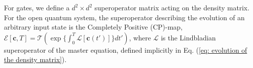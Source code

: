 \documentclass[aps,prl,twocolumn,reprint,superscriptaddress,footinbib]{revtex4-2}
\begin{document}
 For gates, we define a $d^2 \times d^2$ superoperator matrix acting on the density matrix.  For the open quantum system, the superoperator describing the evolution of an arbitrary input state is the Completely Positive (CP)-map, $\mathcal{E}[\bm{c},T]=\mathcal{T}\left(\exp\{\int_0^T \mathcal{L}[\bm{c}(t')]\}dt'\right)$, where $\mathcal{L}$ is the Lindbladian superoperator of the master equation,  defined implicitly in Eq. (\ref{eq: evolution of the density matrix}).



 
\end{document}

